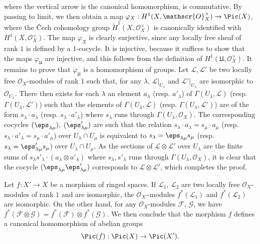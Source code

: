 \begin{remark}
where the vertical arrow is the canonical homomorphism, is commutative. By passing to limit, we then obtain a map $\varphi_X:H^1(X,\mathscr{O}_X^{\times})\to\Pic(X)$, where the \v{C}ech cohomology group $\check{H}^1(X,\mathscr{O}_{X}^{\times})$ is canonically identified with $H^1(X,\mathscr{O}_X^{\times})$. The map $\varphi_X$ is clearly surjective, since any locally free sheaf of rank $1$ is defined by a $1$-cocycle. It is injective, because it suffices to show that the maps $\varphi_{\mathfrak{U}}$ are injective, and this follows from the definition of $H^1(\mathfrak{U},\mathscr{O}_X^{\times})$. It remains to prove that $\varphi_{\mathfrak{U}}$ is a homomorphism of groups. Let $\mathscr{L},\mathscr{L}'$ be two locally free $\mathscr{O}_X$-modules of rank $1$ such that, for any $\lambda$, $\mathscr{L}|_{U_\lambda}$ and $\mathscr{L}'|_{U_\lambda}$ are isomorphic to $\mathscr{O}_{U_\lambda}$. There then exists for each $\lambda$ an element $a_\lambda$ (resp. $a'_\lambda$) of $\Gamma(U_\lambda,\mathscr{L})$ (resp. $\Gamma(U_\lambda,\mathscr{L}')$) such that the elements of $\Gamma(U_\lambda,\mathscr{L})$ (resp. $\Gamma(U_\lambda,\mathscr{L}')$) are of the form $s_\lambda\cdot a_\lambda$ (resp. $s_\lambda\cdot a'_\lambda$) where $s_\lambda$ runs through $\Gamma(U_\lambda,\mathscr{O}_X)$. The corresponding cocycles $(\eps_{\lambda\mu})$, $(\eps_{\lambda\mu}')$ are such that the relation $s_\lambda\cdot a_\lambda=s_\mu\cdot a_\mu$ (resp. $s_\lambda\cdot a'_\lambda=s_\mu\cdot a'_\mu$) over $U_\lambda\cap U_\mu$ is equivalent to $s_\lambda=\eps_{\lambda\mu}s_\mu$ (resp. $s_\lambda=\eps'_{\lambda\mu}s_\mu$) over $U_\lambda\cap U_\mu$. As the sections of $\mathscr{L}\otimes\mathscr{L}'$ over $U_\lambda$ are the finite sums of $s_\lambda s'_\lambda\cdot(a_\lambda\otimes a'_\lambda)$ where $s_\lambda,s'_\lambda$ runs through $\Gamma(U_\lambda,\mathscr{O}_X)$, it is clear that the cocycle $(\eps_{\lambda\mu}\eps'_{\lambda\mu})$ corresponds to $\mathscr{L}\otimes\mathscr{L}'$, which completes the proof.\par
Let $f:X'\to X$ be a morphism of ringed spaces. If $\mathscr{L}_1$, $\mathscr{L}_2$ are two locally free $\mathscr{O}_X$-modules of rank $1$ and are isomorphic, the $\mathscr{O}_{X'}$-modules $f^*(\mathscr{L}_1)$ and $f^*(\mathscr{L}_2)$ are isomorphic. On the other hand, for any $\mathscr{O}_X$-modules $\mathscr{F}$, $\mathscr{G}$, we have $f^*(\mathscr{F}\otimes\mathscr{G})=f^*(\mathscr{F})\otimes f^*(\mathscr{G})$. We then conclude that the morphism $f$ defines a canonical homomorphism of abelian groups
\[\Pic(f):\Pic(X)\to\Pic(X').\]

\end{remark}
